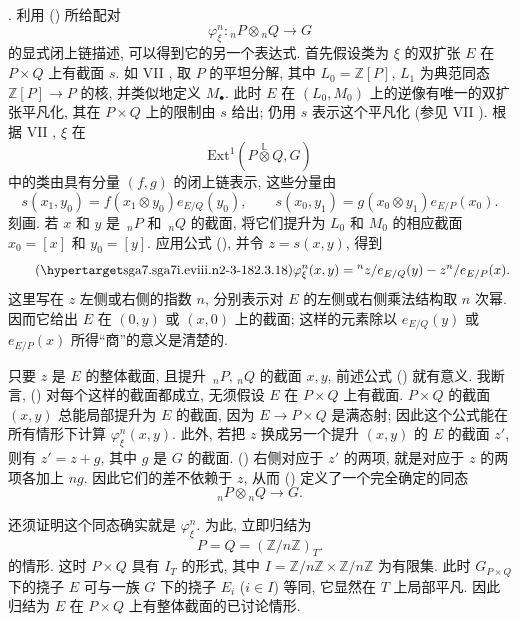 \medskip
\noindent {}. 利用 () 所给配对
\[
 \varphi_\xi^n:{}_nP\otimes{}_nQ\longrightarrow G
\]
的显式闭上链描述, 可以得到它的另一个表达式. 首先假设类为 $\xi$ 的双扩张 $E$ 在 $P\times Q$ 上有截面 $s$. 如 VII , 取 $P$ 的平坦分解, 其中 $L_0=\mathbb Z[P]$, $L_1$ 为典范同态 $\mathbb Z[P]\longrightarrow P$ 的核, 并类似地定义 $M_\bullet$. 此时 $E$ 在 $(L_0,M_0)$ 上的逆像有唯一的双扩张平凡化, 其在 $P\times Q$ 上的限制由 $s$ 给出; 仍用 $s$ 表示这个平凡化 (参见 VII ). 根据 VII , $\xi$ 在
\[
 \mathrm{Ext}^1\!\left(
 P\mathbin{\overset{\mathbb L}{\otimes}}Q,G\right)
\]
中的类由具有分量 $(f,g)$ 的闭上链表示, 这些分量由
\[
 s(x_1,y_0)=f(x_1\otimes y_0)e_{E/Q}(y_0),
 \qquad
 s(x_0,y_1)=g(x_0\otimes y_1)e_{E/P}(x_0).
\]
刻画. 若 $x$ 和 $y$ 是 $\,{}_nP$ 和 $\,{}_nQ$ 的截面, 将它们提升为 $L_0$ 和 $M_0$ 的相应截面 $x_0=[x]$ 和 $y_0=[y]$. 应用公式 (), 并令 $z=s(x,y)$, 得到
\begin{equation}\tag{\SGARefTarget{sga7.sga7i.eviii.n2-3-18}{2.3.18}}
 \varphi_\xi^n(x,y)
 ={}^n z/e_{E/Q}(y)-z^n/e_{E/P}(x).
\end{equation}
这里写在 $z$ 左侧或右侧的指数 $n$, 分别表示对 $E$ 的左侧或右侧乘法结构取 $n$ 次幂. 因而它给出 $E$ 在 $(0,y)$ 或 $(x,0)$ 上的截面; 这样的元素除以 $e_{E/Q}(y)$ 或 $e_{E/P}(x)$ 所得“商”的意义是清楚的.

只要 $z$ 是 $E$ 的整体截面, 且提升 $\,{}_nP,\,{}_nQ$ 的截面 $x,y$, 前述公式 () 就有意义. 我断言, () 对每个这样的截面都成立, 无须假设 $E$ 在 $P\times Q$ 上有截面. $P\times Q$ 的截面 $(x,y)$ 总能局部提升为 $E$ 的截面, 因为 $E\longrightarrow P\times Q$ 是满态射; 因此这个公式能在所有情形下计算 $\varphi_\xi^n(x,y)$. 此外, 若把 $z$ 换成另一个提升 $(x,y)$ 的 $E$ 的截面 $z'$, 则有 $z'=z+g$, 其中 $g$ 是 $G$ 的截面. () 右侧对应于 $z'$ 的两项, 就是对应于 $z$ 的两项各加上 $ng$. 因此它们的差不依赖于 $z$, 从而 () 定义了一个完全确定的同态
\[
 {}_nP\otimes{}_nQ\longrightarrow G.
\]

还须证明这个同态确实就是 $\varphi_\xi^n$. 为此, 立即归结为
\[
 P=Q=(\mathbb Z/n\mathbb Z)_T.
\]
的情形. 这时 $P\times Q$ 具有 $I_T$ 的形式, 其中 $I=\mathbb Z/n\mathbb Z\times\mathbb Z/n\mathbb Z$ 为有限集. 此时 $G_{P\times Q}$ 下的挠子 $E$ 可与一族 $G$ 下的挠子 $E_i$ ($i\in I$) 等同, 它显然在 $T$ 上局部平凡. 因此归结为 $E$ 在 $P\times Q$ 上有整体截面的已讨论情形.

